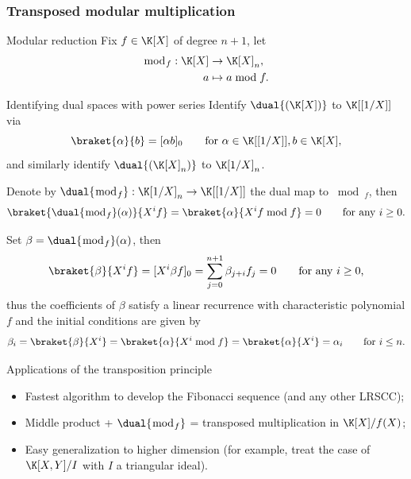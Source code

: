 \documentclass[10pt]{beamer}
\begin{document}
{
\begin{frame}[allowframebreaks]
  \frametitle{Transposed modular multiplication}

  \begin{block}{Modular reduction}
    Fix $f\in\K[X]$ of degree $n+1$, let
    \begin{equation*}
      \begin{aligned}
        \bmod_f:\K[X]&\to\K[X]_n,\\
        a&\mapsto a\bmod f.
      \end{aligned}
    \end{equation*}
  \end{block}
  
  \begin{block}{Identifying dual spaces with power series}
    Identify $\dual{(\K[X])}$ to $\K[[1/X]]$ via
    \begin{equation*}
      \braket{\alpha}{b} = [\alpha b]_0
      \qquad\text{for $\alpha\in\K[[1/X]], b\in\K[X]$,}
    \end{equation*}
    and similarly identify $\dual{(\K[X]_n)}$ to $\K[1/X]_n$.
  \end{block}
  
  \begin{theorem}[Transposed $\bmod$ = extension of linear recurrences]
    Denote by $\dual{\bmod_f}:\K[1/X]_n\to\K[[1/X]]$ the dual map to
    $\bmod_f$, then 
    \begin{equation*}
      \braket{\dual{\bmod_f}(\alpha)}{X^if} = 
      \braket{\alpha}{X^if\bmod f} = 0
      \qquad\text{for any $i\ge0$.}
    \end{equation*}

    Set $\beta=\dual{\bmod_f}(\alpha)$, then
    \begin{equation*}
      \braket{\beta}{X^if} = [X^i\beta f]_0 = \sum_{j=0}^{n+1}\beta_{j+i}f_j = 0
      \qquad\text{for any $i\ge0$,}
    \end{equation*}
    thus the coefficients of $\beta$ satisfy a linear recurrence with
    characteristic polynomial $f$ and the initial conditions are given by
    \begin{equation*}
      \beta_i = \braket{\beta}{X^i} = \braket{\alpha}{X^i\bmod f} = \braket{\alpha}{X^i} = \alpha_i
      \qquad\text{for $i\le n$.}
    \end{equation*}
  \end{theorem}

  \begin{block}{Applications of the transposition principle}
    \begin{itemize}
    \item Fastest algorithm to develop the Fibonacci sequence (and any other LRSCC);
    \item Middle product + $\dual{\bmod_f}$ = transposed multiplication in $\K[X]/f(X)$;
    \item Easy generalization to higher dimension (for example,
      \cite{pascal+schost06} treat the case of $\K[X,Y]/I$ with $I$ a
      triangular ideal).
    \end{itemize}
  \end{block}
\end{frame}
}
\end{document}
